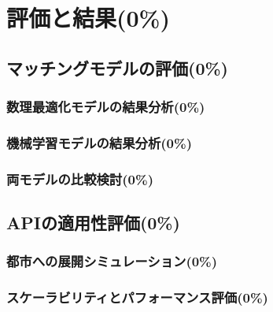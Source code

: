 \section{評価と結果(0\%)}
  \label{sec:評価と結果}
    \par
  
  \subsection{マッチングモデルの評価(0\%)}
    \label{sec:マッチングモデルの評価}
      \par
  
      \subsubsection{数理最適化モデルの結果分析(0\%)}
        \label{sec:数理最適化モデルの結果分析}
          \par
          
      \subsubsection{機械学習モデルの結果分析(0\%)}
        \label{sec:機械学習モデルの結果分析}
          \par
          
      \subsubsection{両モデルの比較検討(0\%)}
        \label{sec:両モデルの比較検討}
          \par
      
  \subsection{APIの適用性評価(0\%)}
    \label{sec:APIの適用性評価}
      \par
      
      \subsubsection{都市への展開シミュレーション(0\%)}
        \label{sec:都市への展開シミュレーション}
          \par
          
      \subsubsection{スケーラビリティとパフォーマンス評価(0\%)}
        \label{sec:スケーラビリティとパフォーマンス評価}
          \par  
